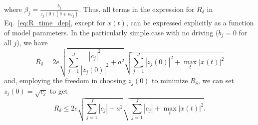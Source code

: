 \documentclass[superscriptaddress,onecolumn,nofootinbib,longbibliography,a4paper,accepted=2026-09-29]{quantumarticle}
\theoremstyle{plain}
\theoremstyle{definition}
\numberwithin{thm}{section}
\numberwithin{assumption}{section}
\numberwithin{lemma}{section}
\numberwithin{prop}{section}
\numberwithin{cor}{section}
\numberwithin{definition}{section}
\numberwithin{rmk}{section}
\numberwithin{equation}{section}
\begin{document}
where $\beta_j=\frac{b_j}{z_j(0)(\delta+i\omega_j)}$. Thus, all terms in the expression for $R_\delta$ in Eq.~\eqref{eq:R_time_dep}, except for $x(t)$, can be expressed explicitly as a function of model parameters. In the particularly simple case with no driving ($b_j=0$ for all $j$), we have
\begin{equation}
    R_\delta = 2e \sqrt{\sum_{j=1}^J \frac{|c_j|^2}{|z_j(0)|^2}+a^2} \sqrt{\sum_{j=1}^J |z_j(0)|^2 + \max_t |x(t)|^2}
\end{equation}
and, employing the freedom in choosing $z_j(0)$ to minimize $R_\delta$, we can set $z_j(0)=\sqrt{c_j}$ to get
\begin{equation}
    R_\delta \leq 2e \sqrt{\sum_{j=1}^J |c_j|+a^2} \sqrt{\sum_{j=1}^J |c_j| + \max_t |x(t)|^2}.
\end{equation}
\end{document}
